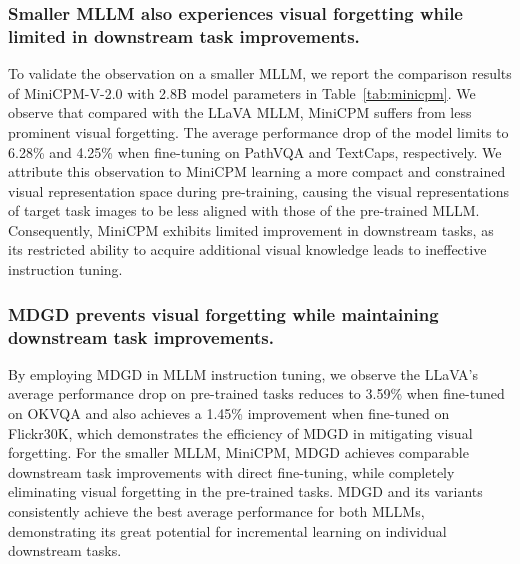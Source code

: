 \subsubsection{Smaller MLLM also experiences visual forgetting while limited in downstream task improvements.}
To validate the observation on a smaller MLLM, we report the comparison results of MiniCPM-V-2.0 with 2.8B model parameters in Table~\ref{tab:minicpm}.
We observe that compared with the LLaVA MLLM, MiniCPM suffers from less prominent visual forgetting.
The average performance drop of the model limits to 6.28\% and 4.25\% when fine-tuning on PathVQA and TextCaps, respectively.
We attribute this observation to MiniCPM learning a more compact and constrained visual representation space during pre-training, 
causing the visual representations of target task images to be less aligned with those of the pre-trained MLLM. 
Consequently, MiniCPM exhibits limited improvement in downstream tasks, 
as its restricted ability to acquire additional visual knowledge leads to ineffective instruction tuning.

\subsubsection{MDGD prevents visual forgetting while maintaining downstream task improvements.}
By employing MDGD in MLLM instruction tuning,
we observe the LLaVA's average performance drop on pre-trained tasks reduces to 3.59\% when fine-tuned on OKVQA
and also achieves a 1.45\% improvement when fine-tuned on Flickr30K,
which demonstrates the efficiency of MDGD in mitigating visual forgetting.
For the smaller MLLM, MiniCPM, MDGD achieves comparable downstream task improvements with direct fine-tuning,
while completely eliminating visual forgetting in the pre-trained tasks.
MDGD and its variants consistently achieve the best average performance for both MLLMs,
demonstrating its great potential for incremental learning on individual downstream tasks.

